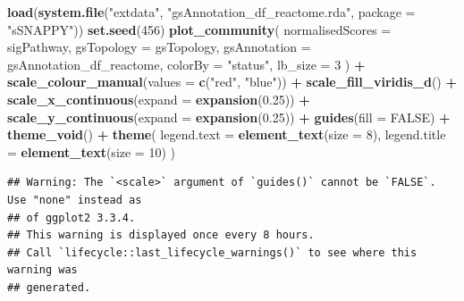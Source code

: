 \documentclass[9pt,a4paper,]{extarticle}
\newenvironment{Shaded}{\begin{snugshade}}{\end{snugshade}}
\newcommand{\AttributeTok}[1]{\textcolor[rgb]{0.13,0.29,0.53}{#1}}
\newcommand{\ConstantTok}[1]{\textcolor[rgb]{0.56,0.35,0.01}{#1}}
\newcommand{\DecValTok}[1]{\textcolor[rgb]{0.00,0.00,0.81}{#1}}
\newcommand{\FloatTok}[1]{\textcolor[rgb]{0.00,0.00,0.81}{#1}}
\newcommand{\FunctionTok}[1]{\textcolor[rgb]{0.13,0.29,0.53}{\textbf{#1}}}
\newcommand{\NormalTok}[1]{#1}
\newcommand{\SpecialCharTok}[1]{\textcolor[rgb]{0.81,0.36,0.00}{\textbf{#1}}}
\newcommand{\StringTok}[1]{\textcolor[rgb]{0.31,0.60,0.02}{#1}}
\begin{document}
\begin{Shaded}
\begin{Highlighting}[]
\FunctionTok{load}\NormalTok{(}\FunctionTok{system.file}\NormalTok{(}\StringTok{"extdata"}\NormalTok{, }\StringTok{"gsAnnotation\_df\_reactome.rda"}\NormalTok{, }\AttributeTok{package =} \StringTok{"sSNAPPY"}\NormalTok{))}
\FunctionTok{set.seed}\NormalTok{(}\DecValTok{456}\NormalTok{)}
\FunctionTok{plot\_community}\NormalTok{(}
    \AttributeTok{normalisedScores =}\NormalTok{ sigPathway,}
    \AttributeTok{gsTopology =}\NormalTok{ gsTopology, }
    \AttributeTok{gsAnnotation =}\NormalTok{ gsAnnotation\_df\_reactome,}
    \AttributeTok{colorBy =} \StringTok{"status"}\NormalTok{,}
    \AttributeTok{lb\_size =} \DecValTok{3}
\NormalTok{) }\SpecialCharTok{+}
    \FunctionTok{scale\_colour\_manual}\NormalTok{(}\AttributeTok{values =} \FunctionTok{c}\NormalTok{(}\StringTok{"red"}\NormalTok{, }\StringTok{"blue"}\NormalTok{)) }\SpecialCharTok{+}
    \FunctionTok{scale\_fill\_viridis\_d}\NormalTok{() }\SpecialCharTok{+}
    \FunctionTok{scale\_x\_continuous}\NormalTok{(}\AttributeTok{expand =} \FunctionTok{expansion}\NormalTok{(}\FloatTok{0.25}\NormalTok{)) }\SpecialCharTok{+}
    \FunctionTok{scale\_y\_continuous}\NormalTok{(}\AttributeTok{expand =} \FunctionTok{expansion}\NormalTok{(}\FloatTok{0.25}\NormalTok{)) }\SpecialCharTok{+}
    \FunctionTok{guides}\NormalTok{(}\AttributeTok{fill =} \ConstantTok{FALSE}\NormalTok{) }\SpecialCharTok{+}
    \FunctionTok{theme\_void}\NormalTok{() }\SpecialCharTok{+}
    \FunctionTok{theme}\NormalTok{(}
        \AttributeTok{legend.text =} \FunctionTok{element\_text}\NormalTok{(}\AttributeTok{size =} \DecValTok{8}\NormalTok{),}
        \AttributeTok{legend.title =} \FunctionTok{element\_text}\NormalTok{(}\AttributeTok{size =} \DecValTok{10}\NormalTok{)}
\NormalTok{    )}
\end{Highlighting}
\end{Shaded}

\begin{verbatim}
## Warning: The `<scale>` argument of `guides()` cannot be `FALSE`. Use "none" instead as
## of ggplot2 3.3.4.
## This warning is displayed once every 8 hours.
## Call `lifecycle::last_lifecycle_warnings()` to see where this warning was
## generated.
\end{verbatim}
\end{document}
